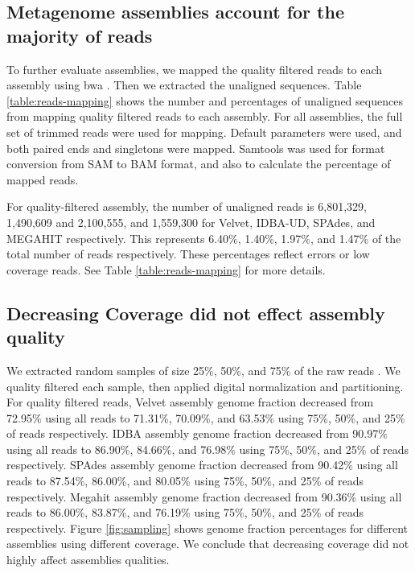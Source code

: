 \subsection*{Metagenome assemblies account for the majority of reads}
To further evaluate assemblies, we mapped the quality filtered reads to each assembly using bwa \cite{bwa-mem}.  Then we extracted the unaligned sequences. Table \ref{table:reads-mapping} shows the number and percentages of unaligned sequences from mapping quality filtered reads to each assembly. For all assemblies, the full set of trimmed reads were used for mapping. Default parameters were used, and both paired ends and singletons were mapped.  Samtools  \cite{samtools} was used for format conversion from SAM to BAM format, and also to calculate the percentage of mapped reads.  


For quality-filtered assembly, the number of unaligned reads is 6,801,329, 1,490,609 and 2,100,555, and 1,559,300 for Velvet, IDBA-UD, SPAdes, and MEGAHIT respectively. This represents 6.40\%, 1.40\%, 1.97\%, and 1.47\% of the total number of reads respectively. These percentages reflect errors or low coverage reads. See Table \ref{table:reads-mapping} for more details. 

\subsection*{Decreasing Coverage did not effect assembly quality}

We extracted random samples of size 25\%, 50\%, and 75\% of the raw reads . We quality filtered each sample, then applied digital normalization and partitioning.  For quality filtered reads, Velvet assembly genome fraction decreased from 72.95\% using all reads to 71.31\%, 70.09\%, and 63.53\% using 75\%, 50\%, and 25\% of reads respectively. IDBA assembly genome fraction decreased from 90.97\% using all reads to 86.90\%, 84.66\%, and 76.98\% using 75\%, 50\%, and 25\% of reads respectively. SPAdes assembly genome fraction decreased from 90.42\% using all reads to 87.54\%, 86.00\%, and 80.05\% using 75\%, 50\%, and 25\% of reads respectively. Megahit  assembly genome fraction decreased from 90.36\% using all reads to 86.00\%, 83.87\%, and 76.19\% using 75\%, 50\%, and 25\% of reads respectively. Figure \ref{fig:sampling} shows genome fraction percentages for different assemblies using different coverage. We conclude that decreasing coverage did not highly affect assemblies qualities. 



